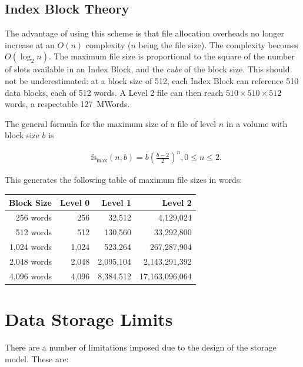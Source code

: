\subsection{Index Block Theory}
\label{sec:index-block-theory}

The advantage of using this scheme is that file allocation overheads
no longer increase at an $O(n)$ complexity ($n$ being the file
size). The complexity becomes $O(\log_2 n)$. The maximum file size is
proportional to the square of the number of slots available in an
Index Block, and the {\em cube\/} of the block size. This should not
be underestimated: at a block size of 512, each Index Block can
reference 510 data blocks, each of 512 words. A Level 2 file can then
reach $510×510×512$ words, a respectable 127~MWords.

The general formula for the maximum size of a file of level $n$ in a
volume with block size $b$ is

\begin{eqnarray}
& \mbox{fs}_{\max}(n, b) = b\left(\frac{b - 2}{2}\right) ^ n\nonumber, 0 \leq n \leq 2.
\end{eqnarray}

This generates the following table of maximum file sizes in words:

\begin{center}
\zebra
\begin{tabular}{rrrr}
Block Size & Level 0 & Level 1 & Level 2 \\
\hline
  256 words  &   256 &    32,512 &      4,129,024 \\
  512 words  &   512 &   130,560 &     33,292,800 \\
1,024 words  & 1,024 &   523,264 &    267,287,904 \\
2,048 words  & 2,048 & 2,095,104 &  2,143,291,392 \\
4,096 words  & 4,096 & 8,384,512 & 17,163,096,064 \\
\hline
\end{tabular}
\end{center}

\section{Data Storage Limits}

There are a number of limitations imposed due to the design of the storage
model. These are:

